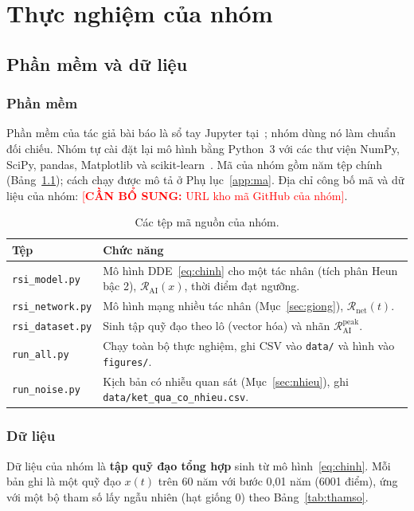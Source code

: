 \documentclass[12pt,a4paper,openany]{report}
\numberwithin{equation}{chapter}   %
\theoremstyle{definition}
\newif\ifdraft \drafttrue          %
\newcommand{\todo}[1]{\ifdraft\textcolor{red}{[\textbf{CẦN BỔ SUNG:} #1]}\fi}
\newcommand{\RAI}{\mathcal{R}_{\mathrm{AI}}}
\newcommand{\Rnet}{\mathcal{R}_{\mathrm{net}}}
\newcommand{\code}[1]{\texttt{#1}}
\begin{document}
\chapter{Thực nghiệm của nhóm}\label{ch:thucnghiem}
\section{Phần mềm và dữ liệu}
\subsection{Phần mềm}
Phần mềm của tác giả bài báo là sổ tay Jupyter tại~\cite{burtsevcode}; nhóm dùng nó làm chuẩn đối chiếu. Nhóm tự cài đặt lại mô hình bằng Python~3 với các thư viện NumPy, SciPy, pandas, Matplotlib và scikit-learn~\cite{pedregosa2011}. Mã của nhóm gồm năm tệp chính (Bảng~\ref{tab:mamgu}); cách chạy được mô tả ở Phụ lục~\ref{app:ma}. Địa chỉ công bố mã và dữ liệu của nhóm: \todo{URL kho mã GitHub của nhóm}.

\begin{table}[ht]
\centering
\caption{Các tệp mã nguồn của nhóm.}\label{tab:mamgu}
\begin{tabular}{@{}p{3.6cm}p{10.2cm}@{}}
\toprule
\textbf{Tệp} & \textbf{Chức năng}\\
\midrule
\code{rsi\_model.py} & Mô hình DDE~\eqref{eq:chinh} cho một tác nhân (tích phân Heun bậc 2), $\RAI(x)$, thời điểm đạt ngưỡng.\\
\code{rsi\_network.py} & Mô hình mạng nhiều tác nhân (Mục~\ref{sec:giong}), $\Rnet(t)$.\\
\code{rsi\_dataset.py} & Sinh tập quỹ đạo theo lô (vector hóa) và nhãn $\RAI^{\mathrm{peak}}$.\\
\code{run\_all.py} & Chạy toàn bộ thực nghiệm, ghi CSV vào \code{data/} và hình vào \code{figures/}.\\
\code{run\_noise.py} & Kịch bản có nhiễu quan sát (Mục~\ref{sec:nhieu}), ghi \code{data/ket\_qua\_co\_nhieu.csv}.\\
\bottomrule
\end{tabular}
\end{table}

\subsection{Dữ liệu}
Dữ liệu của nhóm là \textbf{tập quỹ đạo tổng hợp} sinh từ mô hình~\eqref{eq:chinh}. Mỗi bản ghi là một quỹ đạo $x(t)$ trên 60 năm với bước 0,01 năm (6001 điểm), ứng với một bộ tham số lấy ngẫu nhiên (hạt giống 0) theo Bảng~\ref{tab:thamso}.
\end{document}
